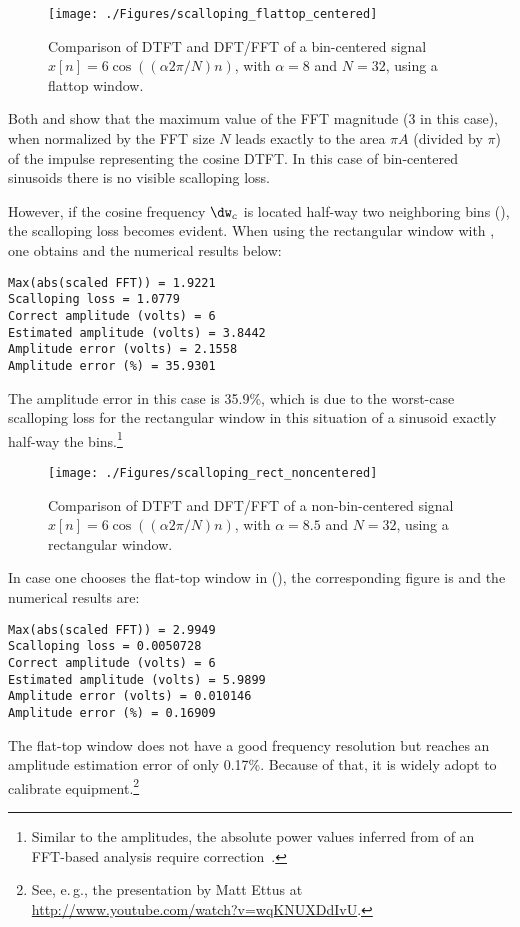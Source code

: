 \begin{figure}[htbp]
\centering
\texttt{[image: ./Figures/scalloping\_flattop\_centered]}
\caption{Comparison of DTFT and DFT/FFT of a bin-centered signal $x[n]=6\cos((\alpha 2 \pi /N) n)$, with $\alpha=8$ and $N=32$, using a flattop window.\label{fig:scalloping_flattop_centered}}
\end{figure}

Both  and  show that the maximum value of the FFT magnitude (3 in this case),
when normalized by the FFT size $N$ leads exactly to the area $\pi A$ (divided by $\pi$) of the impulse representing the cosine DTFT.
In this case of bin-centered sinusoids there is no visible scalloping loss.

However, if the cosine frequency $\dw_c$ is located half-way two neighboring bins (), the scalloping loss becomes
evident. When using the rectangular window with , one obtains  and 
the numerical results below:
\begin{verbatim}
Max(abs(scaled FFT)) = 1.9221
Scalloping loss = 1.0779
Correct amplitude (volts) = 6
Estimated amplitude (volts) = 3.8442
Amplitude error (volts) = 2.1558
Amplitude error (%) = 35.9301
\end{verbatim}
The amplitude error in this case is 35.9\%, which is due to the worst-case scalloping loss for the rectangular window in this situation of a sinusoid exactly half-way the bins.\footnote{Similar to the amplitudes, the absolute power values inferred from of an FFT-based analysis require correction~\cite{Brandt11}.}

\begin{figure}[htbp]
\centering
\texttt{[image: ./Figures/scalloping\_rect\_noncentered]}
\caption{Comparison of DTFT and DFT/FFT of a non-bin-centered signal $x[n]=6\cos((\alpha 2 \pi /N) n)$, with $\alpha=8.5$ and $N=32$, using a rectangular window.\label{fig:scalloping_rect_noncentered}}
\end{figure}

In case one chooses the flat-top window in  (), 
the corresponding figure is  and the numerical results are:
\begin{verbatim}
Max(abs(scaled FFT)) = 2.9949
Scalloping loss = 0.0050728
Correct amplitude (volts) = 6
Estimated amplitude (volts) = 5.9899
Amplitude error (volts) = 0.010146
Amplitude error (%) = 0.16909
\end{verbatim}
The flat-top window does not have a good frequency resolution but reaches an amplitude estimation error of only 0.17\%. Because of that, it is widely adopt to calibrate equipment.\footnote{See, e.\,g., the presentation by Matt Ettus at \url{http://www.youtube.com/watch?v=wqKNUXDdIvU}.} 


